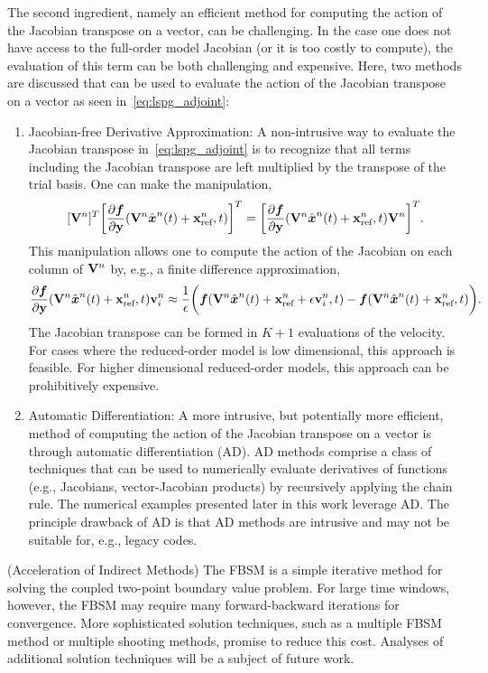 The second ingredient, namely an efficient method for computing the action of the Jacobian transpose on a vector, can be challenging. 
In the case one does not have access to the full-order model Jacobian (or it is too costly to compute), the evaluation of this term can be both challenging and expensive. Here, two methods are discussed that can be used to evaluate the action of the Jacobian transpose on a vector as seen in~\eqref{eq:lspg_adjoint}:
\begin{enumerate}
\item Jacobian-free Derivative Approximation: A non-intrusive way to evaluate the Jacobian transpose in~\eqref{eq:lspg_adjoint} is to recognize that all terms including the Jacobian transpose are left multiplied by the transpose of the trial basis. One can make the manipulation,
$$[\mathbf {V}^{n}]^T \bigg[\frac{\partial \boldsymbol f}{\partial \mathbf{y}} (\mathbf {V}^{n} \hat{ \boldsymbol x}^{n}(t) + \mathbf{x}_\text{ref}^{n},t)\bigg]^T = \bigg[  \frac{\partial \boldsymbol f}{\partial \mathbf{y}} (\mathbf {V}^{n} \hat{ \boldsymbol x}^{n}(t) + \mathbf{x}_\text{ref}^{n},t) \mathbf {V}^{n} \bigg]^T.$$
This manipulation allows one to compute the action of the Jacobian on each column of $\mathbf {V}^{n}$ by, e.g., a finite difference approximation,
$$\frac{\partial \boldsymbol f}{\partial \mathbf{y}}(\mathbf {V}^{n} \hat{ \boldsymbol x}^{n}(t) + \mathbf{x}_\text{ref}^{n},t) \mathbf{v}_i^n \approx \frac{1}{\epsilon}\bigg( \boldsymbol f(\mathbf {V}^{n}\hat{ \boldsymbol x}^{n}(t) + \mathbf{x}_\text{ref}^{n} + \epsilon \mathbf{v}_i^n,t) - \boldsymbol f(\mathbf {V}^{n} \hat{ \boldsymbol x}^{n}(t) + \mathbf{x}_\text{ref}^{n},t) \bigg).$$
The Jacobian transpose can be formed in $K+1$ evaluations of the velocity. For cases where the reduced-order model is low dimensional, this approach is feasible. For higher dimensional reduced-order models, this approach can be prohibitively expensive.

\item Automatic Differentiation: A more intrusive, but potentially more efficient, method of computing the action of the Jacobian transpose on a vector is through automatic differentiation (AD). AD methods comprise a class of techniques that can be used to numerically evaluate derivatives of functions (e.g., Jacobians, vector-Jacobian products) by recursively applying the chain rule. The numerical examples presented later in this work leverage AD. The principle drawback of AD is that AD methods are intrusive and may not be suitable for, e.g., legacy codes.  
\end{enumerate}

\begin{remark}\label{remark:fbsm}(Acceleration of Indirect Methods)
The FBSM is a simple iterative method for solving the coupled two-point boundary value problem. For large time windows, however, the FBSM may require many 
forward-backward iterations for convergence. More sophisticated solution techniques, such as a multiple FBSM method or multiple shooting methods, promise 
to reduce this cost. Analyses of additional solution techniques will be a subject of future work.
\end{remark}

